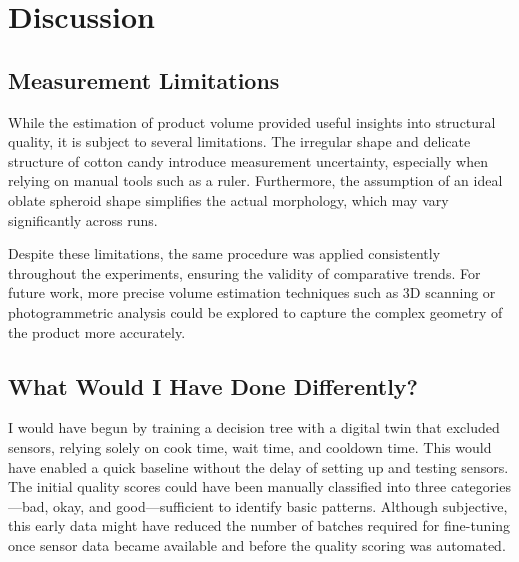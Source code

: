 \chapter{Discussion}
\label{sec:discussion}

\section{Measurement Limitations}

While the estimation of product volume provided useful insights into structural quality, it is subject to several limitations. The irregular shape and delicate structure of cotton candy introduce measurement uncertainty, especially when relying on manual tools such as a ruler. Furthermore, the assumption of an ideal oblate spheroid shape simplifies the actual morphology, which may vary significantly across runs.

Despite these limitations, the same procedure was applied consistently throughout the experiments, ensuring the validity of comparative trends. For future work, more precise volume estimation techniques such as 3D scanning or photogrammetric analysis could be explored to capture the complex geometry of the product more accurately.

\section{What Would I Have Done Differently?}
I would have begun by training a decision tree with a digital twin that excluded sensors, relying solely on cook time, wait time, and cooldown time. This would have enabled a quick baseline without the delay of setting up and testing sensors. The initial quality scores could have been manually classified into three categories—bad, okay, and good—sufficient to identify basic patterns. Although subjective, this early data might have reduced the number of batches required for fine-tuning once sensor data became available and before the quality scoring was automated.